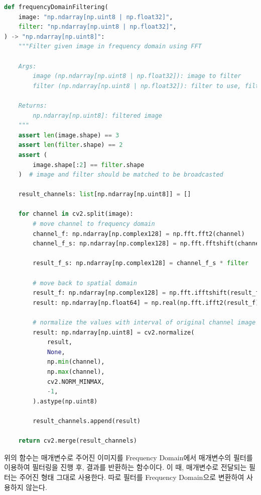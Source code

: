 \documentclass{report}
\begin{document}
\begin{lstlisting}[language=Python, caption=Primitive - frequencyDomainFiltering, firstnumber=28]
def frequencyDomainFiltering(
    image: "np.ndarray[np.uint8 | np.float32]",
    filter: "np.ndarray[np.uint8 | np.float32]",
) -> "np.ndarray[np.uint8]":
    """Filter given image in frequency domain using FFT

    Args:
        image (np.ndarray[np.uint8 | np.float32]): image to filter
        filter (np.ndarray[np.uint8 | np.float32]): filter to use, filter shape should be same with image in the perspective of width and height

    Returns:
        np.ndarray[np.uint8]: filtered image
    """
    assert len(image.shape) == 3
    assert len(filter.shape) == 2
    assert (
        image.shape[:2] == filter.shape
    )  # image and filter should be matched to be broadcasted

    result_channels: list[np.ndarray[np.uint8]] = []

    for channel in cv2.split(image):
        # move channel to frequency domain
        channel_f: np.ndarray[np.complex128] = np.fft.fft2(channel)
        channel_f_s: np.ndarray[np.complex128] = np.fft.fftshift(channel_f)

        result_f_s: np.ndarray[np.complex128] = channel_f_s * filter

        # move back to spatial domain
        result_f: np.ndarray[np.complex128] = np.fft.ifftshift(result_f_s)
        result: np.ndarray[np.float64] = np.real(np.fft.ifft2(result_f))

        # normalize the values with interval of original channel image
        result: np.ndarray[np.uint8] = cv2.normalize(
            result,
            None,
            np.min(channel),
            np.max(channel),
            cv2.NORM_MINMAX,
            -1,
        ).astype(np.uint8)

        result_channels.append(result)

    return cv2.merge(result_channels)
\end{lstlisting}

위의 함수는 매개변수로 주어진 이미지를 Frequency Domain에서 매개변수의 필터를 이용하여 필터링을 진행 후, 결과를 반환하는 함수이다.
이 때, 매개변수로 전달되는 필터는 주어진 형태 그대로 사용한다.
따로 필터를 Frequency Domain으로 변환하여 사용하지 않는다.
\end{document}
